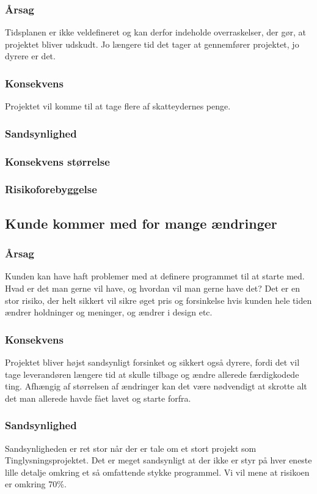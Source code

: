 \documentclass[10pt,a4paper,danish]{article}
\begin{document}
\subsubsection{Årsag}
Tidsplanen er ikke veldefineret og kan derfor indeholde overraskelser, der gør, at projektet bliver udskudt. Jo længere tid det tager at gennemfører projektet, jo dyrere er det.
\subsubsection{Konsekvens}
Projektet vil komme til at tage flere af skatteydernes penge.
\subsubsection{Sandsynlighed}

\subsubsection{Konsekvens størrelse}

\subsubsection{Risikoforebyggelse}


\subsection{Kunde kommer med for mange ændringer}
\subsubsection{Årsag}
Kunden kan have haft problemer med at definere programmet til at starte med. Hvad er det man gerne vil have, og hvordan vil man gerne have det? Det er en stor risiko, der helt sikkert vil sikre øget pris og forsinkelse hvis kunden hele tiden ændrer holdninger og meninger, og ændrer i design etc.

\subsubsection{Konsekvens}
Projektet bliver højst sandsynligt forsinket og sikkert også dyrere, fordi det vil tage leverandøren længere tid at skulle tilbage og ændre allerede færdigkodede ting. Afhængig af størrelsen af ændringer kan det være nødvendigt at skrotte alt det man allerede havde fået lavet og starte forfra.

\subsubsection{Sandsynlighed}
Sandsynligheden er ret stor når der er tale om et stort projekt som Tinglysningsprojektet. Det er meget sandsynligt at der ikke er styr på hver eneste lille detalje omkring et så omfattende stykke programmel. Vi vil mene at risikoen er omkring 70\%.
\end{document}
